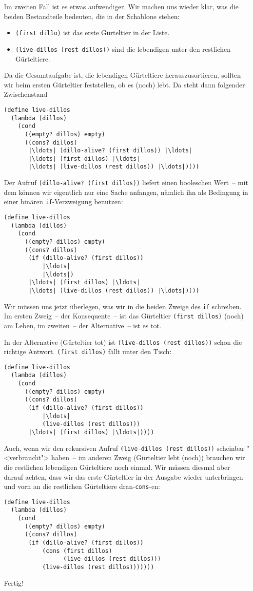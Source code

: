 Im zweiten Fall ist es etwas aufwendiger.  Wir machen uns wieder klar,
was die beiden Bestandteile bedeuten, die in der Schablone stehen:
%
\begin{itemize}
\item \lstinline{(first dillo)} ist das erste Gürteltier in der Liste.
\item \lstinline{(live-dillos (rest dillos))} sind die lebendigen
  unter den restlichen Gürteltiere.
\end{itemize}
%
Da die Gesamtaufgabe ist, die lebendigen Gürteltiere
herauszusortieren, sollten wir beim ersten Gürteltier feststellen, ob
es (noch) lebt.  Da steht dann folgender Zwischenstand
%
\begin{lstlisting}
(define live-dillos
  (lambda (dillos)
    (cond
      ((empty? dillos) empty)
      ((cons? dillos)
       |\ldots| (dillo-alive? (first dillos)) |\ldots|
       |\ldots| (first dillos) |\ldots|
       |\ldots| (live-dillos (rest dillos)) |\ldots|))))
\end{lstlisting}
%
Der Aufruf \lstinline{(dillo-alive? (first dillos))} liefert einen
booleschen Wert~-- mit dem können wir eigentlich nur eine Sache
anfangen, nämlich ihn als Bedingung in einer binären
\lstinline{if}-Verzweigung benutzen:
%
\begin{lstlisting}
(define live-dillos
  (lambda (dillos)
    (cond
      ((empty? dillos) empty)
      ((cons? dillos)
       (if (dillo-alive? (first dillos))
           |\ldots|
           |\ldots|)
       |\ldots| (first dillos) |\ldots|
       |\ldots| (live-dillos (rest dillos)) |\ldots|))))
\end{lstlisting}
%
Wir müssen uns jetzt überlegen, was wir in die beiden Zweige des
\lstinline{if} schreiben.  Im ersten Zweig~-- der Konsequente~--  ist
das Gürteltier \lstinline{(first dillos)} (noch) am Leben, im
zweiten~-- der Alternative~-- ist es tot.

In der Alternative (Gürteltier tot) ist \lstinline{(live-dillos (rest dillos))} schon
die richtige Antwort.  \lstinline{(first dillos)} fällt unter den Tisch:
%
\begin{lstlisting}
(define live-dillos
  (lambda (dillos)
    (cond
      ((empty? dillos) empty)
      ((cons? dillos)
       (if (dillo-alive? (first dillos))
           |\ldots|
           (live-dillos (rest dillos)))
       |\ldots| (first dillos) |\ldots|))))
\end{lstlisting}
%
Auch, wenn wir den rekursiven Aufruf \lstinline{(live-dillos (rest dillos))}
scheinbar "<verbraucht"> haben~-- im  anderen Zweig (Gürteltier lebt
(noch)) brauchen wir die restlichen lebendigen Gürteltiere noch
einmal.  Wir müssen diesmal aber darauf achten, dass wir das erste
Gürteltier in der Ausgabe wieder unterbringen und vorn an die
restlichen Gürteltiere dran-\lstinline{cons}-en:
%
\begin{lstlisting}
(define live-dillos
  (lambda (dillos)
    (cond
      ((empty? dillos) empty)
      ((cons? dillos)
       (if (dillo-alive? (first dillos))
           (cons (first dillos)
                 (live-dillos (rest dillos)))
           (live-dillos (rest dillos)))))))
\end{lstlisting}
%
Fertig!

